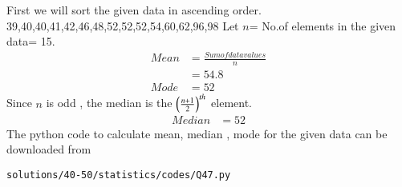  First we will sort the given data in ascending order.  
 39,40,40,41,42,46,48,52,52,52,54,60,62,96,98
 Let $n$= No.of elements in the given data= 15.
\begin{align}
Mean &= \frac{Sum of data values}{n}\\
&= 54.8\\
Mode &= 52
\end{align}
 Since $n$ is odd , the median is the $\left(\frac{n+1}{2}\right)^{th}$ element.
\begin{align}
Median &= 52
\end{align} 
 The python code to calculate mean, median , mode for the given data can be downloaded from 
\begin{lstlisting}
solutions/40-50/statistics/codes/Q47.py
\end{lstlisting}


